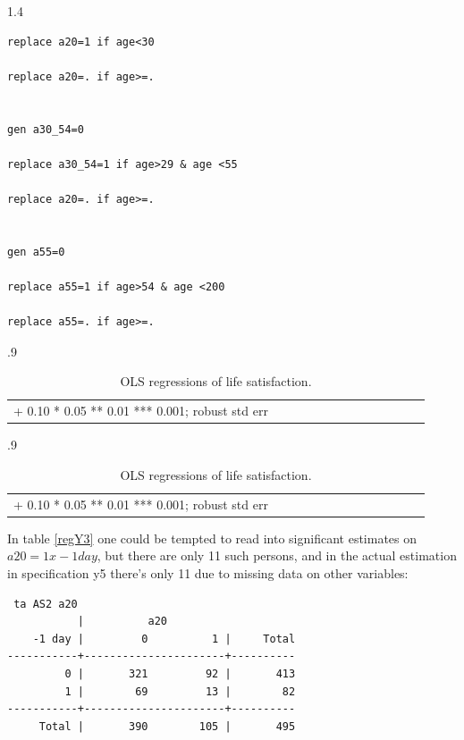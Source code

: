 \documentclass[10pt, letterpaper]{article}
\begin{document}
\begin{spacing}{1.4}
\begin{verbatim}
replace a20=1 if age<30

replace a20=. if age>=.


gen a30_54=0

replace a30_54=1 if age>29 & age <55

replace a20=. if age>=.


gen a55=0

replace a55=1 if age>54 & age <200

replace a55=. if age>=.
\end{verbatim}



\begin{spacing}{.9} \begin{table}[H]\centering   \begin{scriptsize} \begin{tabular}{p{1.8in}p{.5in}p{.5in}p{.5in}p{.5in}p{.5in}p{.5in}p{.5in}p{.5in}p{.5in}p{.5 in}p{.5in}p{.5 in}}\hline  \hline + 0.10 * 0.05 ** 0.01 *** 0.001; robust std err \end{tabular}\end{scriptsize}\caption{\label{regY1}OLS regressions of life satisfaction.}\end{table} \end{spacing}

\begin{spacing}{.9} \begin{table}[H]\centering   \begin{scriptsize} \begin{tabular}{p{1.8in}p{.5in}p{.5in}p{.5in}p{.5in}p{.5in}p{.5in}p{.5in}p{.5in}p{.5in}p{.5 in}p{.5in}p{.5 in}}\hline  \hline + 0.10 * 0.05 ** 0.01 *** 0.001; robust std err \end{tabular}\end{scriptsize}\caption{\label{regY2}OLS regressions of life satisfaction.}\end{table} \end{spacing}

In table \ref{regY3} one could be tempted to read into significant estimates on
$a20=1 x  -1 day$, but there are only 11 such persons, and in the actual estimation
in specification y5 there's only 11 due to missing data on other variables: 

\begin{verbatim}
 ta AS2 a20
           |          a20
    -1 day |         0          1 |     Total
-----------+----------------------+----------
         0 |       321         92 |       413 
         1 |        69         13 |        82 
-----------+----------------------+----------
     Total |       390        105 |       495 




\end{verbatim}
\end{spacing}
\end{document}
